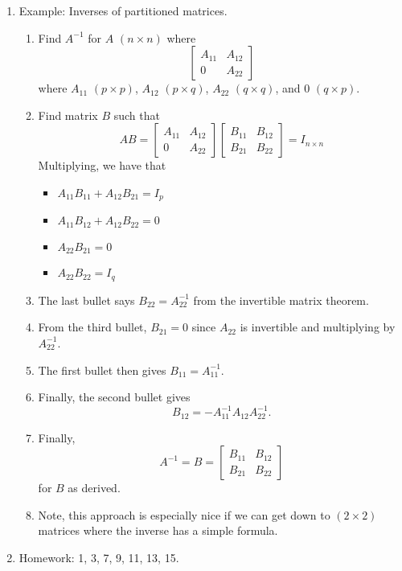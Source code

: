 \documentclass{article}
\begin{document}
\begin{enumerate}
\item Example: Inverses of partitioned matrices.
\begin{enumerate}
\item Find $A^{-1}$ for $A$ $(n \times n)$ where
\[
\left[
\begin{array}{cc}
A_{11} & A_{12} \\
0 & A_{22}
\end{array}
\right]
\]
where $A_{11}$ $(p \times p)$, $A_{12}$ $(p \times q)$, $A_{22}$ $(q \times q)$, and $0$ $(q \times p)$.
\item Find matrix $B$ such that 
\[
AB = \left[
\begin{array}{cc}
A_{11} & A_{12} \\
0 & A_{22}
\end{array} \right] 
\left[ \begin{array}{cc}
B_{11} & B_{12} \\
B_{21} & B_{22}
\end{array} \right]
= I_{n \times n}
\]
Multiplying, we have that
\begin{itemize}
\item $A_{11} B_{11} + A_{12}B_{21} = I_p$
\item $A_{11} B_{12} + A_{12}B_{22} = 0$
\item $A_{22} B_{21} = 0$ 
\item $A_{22} B_{22} = I_q$
\end{itemize}
\item The last bullet says $B_{22} = A_{22}^{-1}$ from the invertible matrix theorem.
\item From the third bullet, $B_{21}=0$ since $A_{22}$ is invertible and multiplying by $A_{22}^{-1}$.
\item The first bullet then gives $B_{11}=A_{11}^{-1}$. 
\item Finally, the second bullet gives
\[
B_{12} = -A_{11}^{-1} A_{12} A_{22}^{-1}.
\]
\item Finally, 
\[
A^{-1} = B = \left[ \begin{array}{cc}
B_{11} & B_{12} \\
B_{21} & B_{22}
\end{array} \right]
\] 
for $B$ as derived.
\item Note, this approach is especially nice if we can get down to $(2 \times 2)$ matrices where the inverse has a simple formula.
\end{enumerate}

\item Homework: 1, 3, 7, 9, 11, 13, 15.

\end{enumerate}
\end{document}
